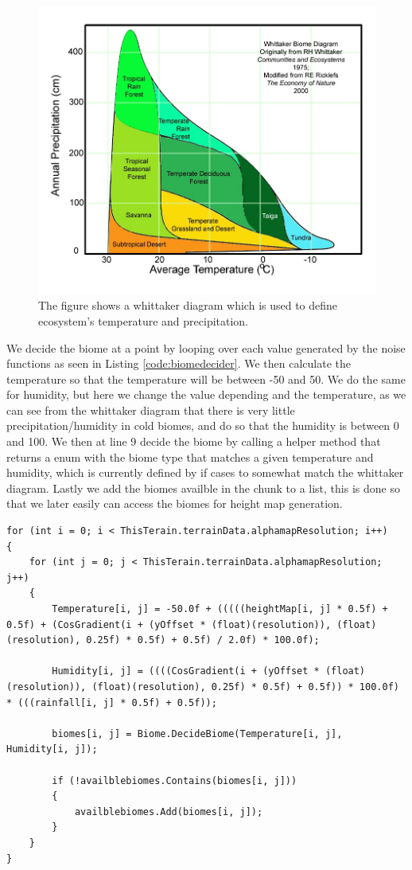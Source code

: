 \begin{figure}[H]
	\includegraphics[width=1\linewidth]{img/whittaker}
	\centering
	\caption{The figure shows a whittaker diagram which is used to define ecosystem's temperature and precipitation.}
	\label{fig:whittaker}
\end{figure}

We decide the biome at a point by looping over each value generated by the noise functions as seen in Listing \ref{code:biomedecider}. We then calculate the temperature so that the temperature will be between -50 and 50. We do the same for humidity, but here we change the value depending and the temperature, as we can see from the whittaker diagram that there is very little precipitation/humidity in cold biomes, and do so that the humidity is between 0 and 100. We then at line 9 decide the biome by calling a helper method that returns a enum with the biome type that matches a given temperature and humidity, which is currently defined by if cases to somewhat match the whittaker diagram. Lastly we add the biomes availble in the chunk to a list, this is done so that we later easily can access the biomes for height map generation.

\begin{lstlisting}[caption = A code snippet from the chunk class in our project., label=code:biomedecider, language=Csharp]
for (int i = 0; i < ThisTerain.terrainData.alphamapResolution; i++)
{
	for (int j = 0; j < ThisTerain.terrainData.alphamapResolution; j++)
    {
        Temperature[i, j] = -50.0f + (((((heightMap[i, j] * 0.5f) + 0.5f) + (CosGradient(i + (yOffset * (float)(resolution)), (float)(resolution), 0.25f) * 0.5f) + 0.5f) / 2.0f) * 100.0f);
        
        Humidity[i, j] = ((((CosGradient(i + (yOffset * (float)(resolution)), (float)(resolution), 0.25f) * 0.5f) + 0.5f)) * 100.0f) * (((rainfall[i, j] * 0.5f) + 0.5f));
       
        biomes[i, j] = Biome.DecideBiome(Temperature[i, j], Humidity[i, j]);
        
        if (!availblebiomes.Contains(biomes[i, j]))
        {
        	availblebiomes.Add(biomes[i, j]);
        }	
	}
}
\end{lstlisting}


